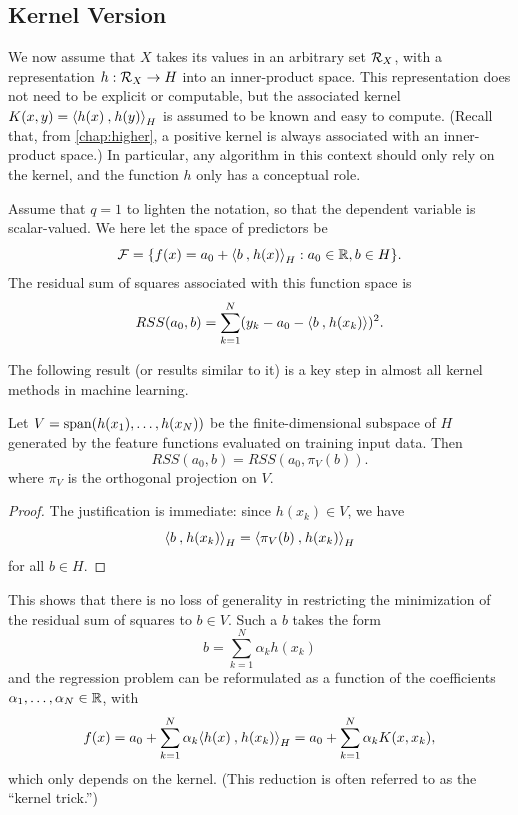 \subsection{Kernel Version}
We now  assume that $X$ takes its values in an arbitrary set ${\mathcal R}_X$, with a representation $h:{\mathcal R}_X \to H$ into an inner-product space. This representation does not need to be explicit or computable, but the associated kernel $K(x,y) = {\langle {h(x)}\mathbin{,} {h(y)}\rangle}_H$ is assumed to be known and easy to compute. (Recall that, from \cref{chap:higher}, a positive kernel is always associated with an inner-product space.) In particular, any algorithm in this context should only rely on the kernel, and the function $h$ only has a conceptual role. 

Assume that $q=1$ to lighten the notation, so that the dependent variable is scalar-valued. We here let the space of predictors be
\[
{\mathcal F} = \{ f(x) = {a_0} +{\langle {b}\mathbin{,} {h(x)}\rangle}_{H}: {a_0}\in {\mathbb{R}}, b\in H\}.  
\]
The residual sum of squares associated with this function space is
\[
RSS({a_0}, b) = \sum_{k=1}^N (y_k - {a_0} - {\langle {b}\mathbin{,} {h(x_k)}\rangle})^2.
\]

The following result (or results similar to it) is a key step in almost all kernel methods in machine learning. 
\begin{proposition}
\label{prop:proj.kern}
Let $V = \mathrm{span}(h(x_1), \ldots, h(x_N))$ be the finite-dimensional subspace of $H$ generated by the feature functions evaluated on training input data. Then
\[
RSS({a_0}, b) = RSS({a_0}, \pi_V(b)).
\]
where $\pi_V$ is the orthogonal projection on $V$.
\end{proposition}
\begin{proof}
The justification is immediate: since $h(x_k) \in V$, we have 
\[
{\langle {b}\mathbin{,} {h(x_k)}\rangle}_H = {\langle {\pi_V(b)}\mathbin{,} {h(x_k)}\rangle}_H
\]
 for all $b\in H$.
\end{proof}

This shows that there is no loss of generality in restricting the minimization of the residual sum of squares to $b\in V$. Such a $b$ takes the form
\begin{equation}
\label{eq:b.kern}
b = \sum_{k=1}^N \alpha_k h(x_k)
\end{equation}
and the regression problem can be reformulated as a function of the coefficients $\alpha_1, \ldots, \alpha_N\in {\mathbb{R}}$, with 
\[
f(x) = {a_0} + \sum_{k=1}^N \alpha_k {\langle {h(x)}\mathbin{,} {h(x_k)}\rangle}_H = {a_0} + \sum_{k=1}^N \alpha_k K(x,x_k),
\]
which only depends on the kernel. (This reduction is often referred to as the ``kernel trick.'')

